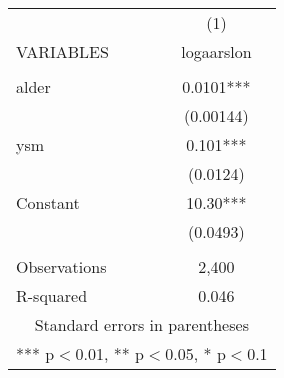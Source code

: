 \documentclass[]{article}
\begin{document}
\begin{tabular}{lc} \hline
 & (1) \\
VARIABLES & logaarslon \\ \hline
 &  \\
alder & 0.0101*** \\
 & (0.00144) \\
ysm & 0.101*** \\
 & (0.0124) \\
Constant & 10.30*** \\
 & (0.0493) \\
 &  \\
Observations & 2,400 \\
 R-squared & 0.046 \\ \hline
\multicolumn{2}{c}{ Standard errors in parentheses} \\
\multicolumn{2}{c}{ *** p$<$0.01, ** p$<$0.05, * p$<$0.1} \\
\end{tabular}
\end{document}
